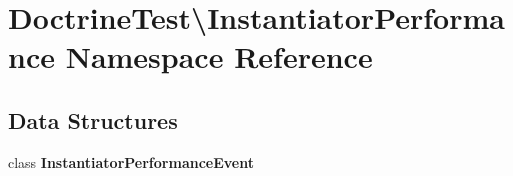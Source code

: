 \section{Doctrine\+Test\textbackslash{}Instantiator\+Performance Namespace Reference}
\label{namespace_doctrine_test_1_1_instantiator_performance}
\subsection*{Data Structures}
\begin{DoxyCompactItemize}
\item 
class {\bf Instantiator\+Performance\+Event}
\end{DoxyCompactItemize}
